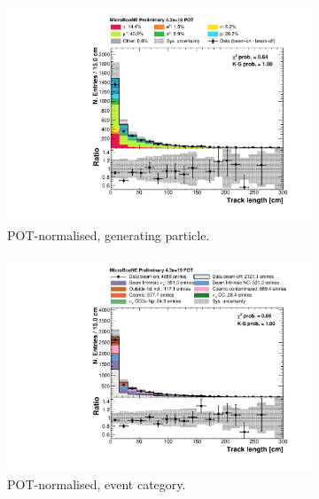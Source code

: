 \begin{figure}[htbp]
\centering
  \begin{subfigure}{0.49\textwidth}
    \includegraphics[width=\linewidth]{figures/h_track_length_pdg.pdf}
    \caption{POT-normalised, generating particle.} \label{fig:length_pdg}
  \end{subfigure}
  \begin{subfigure}{0.49\textwidth}
    \includegraphics[width=\linewidth]{figures/h_track_length.pdf}
    \caption{POT-normalised, event category.} \label{fig:length_pot}
  \end{subfigure}
    \begin{subfigure}{0.49\textwidth}

\end{subfigure}
\end{figure}
